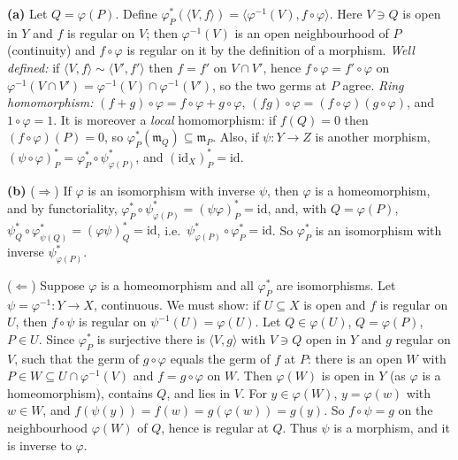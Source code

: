 \documentclass[11pt]{article}
\begin{document}
\pf
\textbf{(a)} Let $Q=\varphi(P)$. Define $\varphi^*_P(\langle V,f\rangle)=\langle\varphi^{-1}(V),f\circ\varphi\rangle$. Here $V\ni Q$ is open in $Y$ and $f$ is regular on $V$; then $\varphi^{-1}(V)$ is an open neighbourhood of $P$ (continuity) and $f\circ\varphi$ is regular on it by the definition of a morphism. \emph{Well defined:} if $\langle V,f\rangle\sim\langle V',f'\rangle$ then $f=f'$ on $V\cap V'$, hence $f\circ\varphi=f'\circ\varphi$ on $\varphi^{-1}(V\cap V')=\varphi^{-1}(V)\cap\varphi^{-1}(V')$, so the two germs at $P$ agree. \emph{Ring homomorphism:} $(f+g)\circ\varphi=f\circ\varphi+g\circ\varphi$, $(fg)\circ\varphi=(f\circ\varphi)(g\circ\varphi)$, and $1\circ\varphi=1$. It is moreover a \emph{local} homomorphism: if $f(Q)=0$ then $(f\circ\varphi)(P)=0$, so $\varphi^*_P(\mathfrak m_Q)\subseteq\mathfrak m_P$. Also, if $\psi:Y\to Z$ is another morphism, $(\psi\circ\varphi)^*_P=\varphi^*_P\circ\psi^*_{\varphi(P)}$, and $(\mathrm{id}_X)^*_P=\mathrm{id}$.

\textbf{(b)} ($\Rightarrow$) If $\varphi$ is an isomorphism with inverse $\psi$, then $\varphi$ is a homeomorphism, and by functoriality, $\varphi^*_P\circ\psi^*_{\varphi(P)}=(\psi\varphi)^*_P=\mathrm{id}$, and, with $Q=\varphi(P)$, $\psi^*_{Q}\circ\varphi^*_{\psi(Q)}=(\varphi\psi)^*_Q=\mathrm{id}$, i.e.\ $\psi^*_{\varphi(P)}\circ\varphi^*_P=\mathrm{id}$. So $\varphi^*_P$ is an isomorphism with inverse $\psi^*_{\varphi(P)}$.

($\Leftarrow$) Suppose $\varphi$ is a homeomorphism and all $\varphi^*_P$ are isomorphisms. Let $\psi=\varphi^{-1}:Y\to X$, continuous. We must show: if $U\subseteq X$ is open and $f$ is regular on $U$, then $f\circ\psi$ is regular on $\psi^{-1}(U)=\varphi(U)$. Let $Q\in\varphi(U)$, $Q=\varphi(P)$, $P\in U$. Since $\varphi^*_P$ is surjective there is $\langle V,g\rangle$ with $V\ni Q$ open in $Y$ and $g$ regular on $V$, such that the germ of $g\circ\varphi$ equals the germ of $f$ at $P$: there is an open $W$ with $P\in W\subseteq U\cap\varphi^{-1}(V)$ and $f=g\circ\varphi$ on $W$. Then $\varphi(W)$ is open in $Y$ (as $\varphi$ is a homeomorphism), contains $Q$, and lies in $V$. For $y\in\varphi(W)$, $y=\varphi(w)$ with $w\in W$, and $f(\psi(y))=f(w)=g(\varphi(w))=g(y)$. So $f\circ\psi=g$ on the neighbourhood $\varphi(W)$ of $Q$, hence is regular at $Q$. Thus $\psi$ is a morphism, and it is inverse to $\varphi$.
\end{document}

